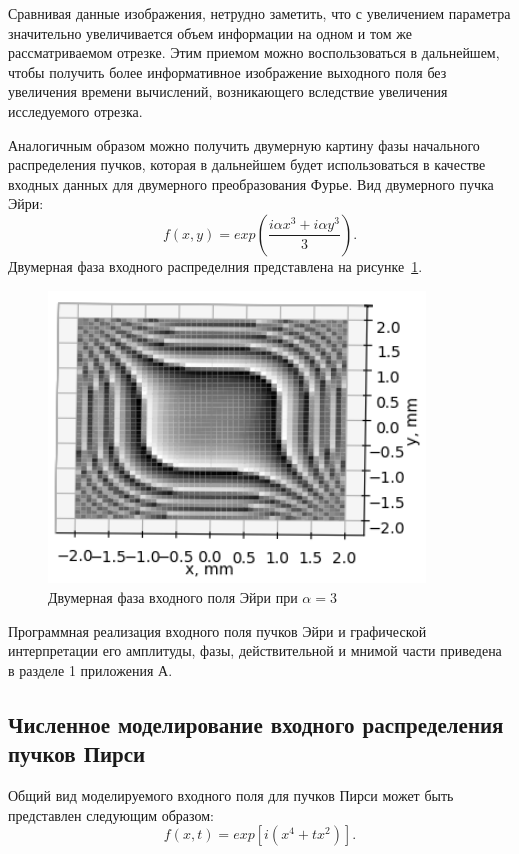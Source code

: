 {\begin{figure}[H]
    \end{figure}

    Сравнивая данные изображения, нетрудно заметить, что с увеличением
    параметра значительно увеличивается объем информации на одном и том же
    рассматриваемом отрезке. Этим приемом можно воспользоваться в
    дальнейшем, чтобы получить более информативное изображение выходного поля без увеличения времени вычислений, возникающего вследствие
    увеличения исследуемого отрезка.

    Аналогичным образом можно получить двумерную картину фазы начального распределения пучков,
    которая в дальнейшем будет использоваться в качестве входных данных для двумерного преобразования Фурье.
    Вид двумерного пучка Эйри:
    \begin{equation*}
        \label{zero_time_condition}
        f(x, y) = exp(\frac{i \alpha x^3 + i \alpha y^3}{3}).
    \end{equation*}
    Двумерная фаза входного распределния представлена на рисунке~\ref{airy_phase_2d}.

    \begin{figure}[H]
        \begin{center}
            \includegraphics[width=10cm]{plots/airy_phase_2d_ortho}
            \caption{Двумерная фаза входного поля Эйри при $\alpha  = 3$}
            \label{airy_phase_2d}
        \end{center}

    \end{figure}

    Программная реализация входного поля пучков Эйри и графической
    интерпретации его амплитуды, фазы, действительной и мнимой части
    приведена в разделе 1 приложения А.


    \subsection{Численное моделирование входного распределения пучков Пирси}
    {
    Общий вид моделируемого входного поля для пучков Пирси может быть
    представлен следующим образом:
    \begin{equation*}
        f(x, t)  = exp[i(x^4 + tx^2)].
    \end{equation*}

}}
